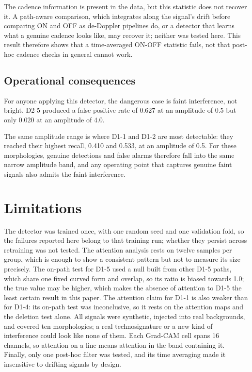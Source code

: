 \documentclass[11pt]{article}
\begin{document}
The cadence information is present in the data, but this statistic does not recover it. A path-aware comparison, which integrates along the signal's drift before comparing ON and OFF as de-Doppler pipelines do, or a detector that learns what a genuine cadence looks like, may recover it; neither was tested here. This result therefore shows that a time-averaged ON-OFF statistic fails, not that post-hoc cadence checks in general cannot work.

\subsection{Operational consequences}
For anyone applying this detector, the dangerous case is faint interference, not bright. D2-5 produced a false positive rate of 0.627 at an amplitude of 0.5 but only 0.020 at an amplitude of 4.0.


The same amplitude range is where D1-1 and D1-2 are most detectable: they reached their highest recall, 0.410 and 0.533, at an amplitude of 0.5. For these morphologies, genuine detections and false alarms therefore fall into the same narrow amplitude band, and any operating point that captures genuine faint signals also admits the faint interference.

\section{Limitations}
The detector was trained once, with one random seed and one validation fold, so the failures reported here belong to that training run; whether they persist across retraining was not tested. The attention analysis rests on twelve samples per group, which is enough to show a consistent pattern but not to measure its size precisely. The on-path test for D1-5 used a null built from other D1-5 paths, which share one fixed curved form and overlap, so its ratio is biased towards 1.0; the true value may be higher, which makes the absence of attention to D1-5 the least certain result in this paper. The attention claim for D1-1 is also weaker than for D1-4: its on-path test was inconclusive, so it rests on the attention maps and the deletion test alone. All signals were synthetic, injected into real backgrounds, and covered ten morphologies; a real technosignature or a new kind of interference could look like none of them. Each Grad-CAM cell spans 16 channels, so attention on a line means attention in the band containing it. Finally, only one post-hoc filter was tested, and its time averaging made it insensitive to drifting signals by design.
\end{document}
